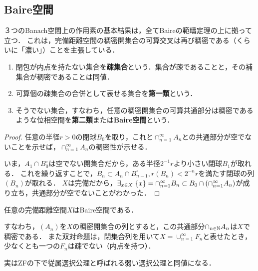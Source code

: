 \documentclass[uplatex,dvipdfmx]{jsreport}
\begin{document}
\subsection{Baire空間}

\begin{tcolorbox}[colframe=ForestGreen, colback=ForestGreen!10!white,breakable,colbacktitle=ForestGreen!40!white,coltitle=black,fonttitle=\bfseries\sffamily,
    title=]
        ３つのBanach空間上の作用素の基本結果は，全てBaireの範疇定理の上に拠って立つ．
        これは，完備距離空間の稠密開集合の可算交叉は再び稠密である（くらいに「濃い」）ことを主張している．
\end{tcolorbox}

\begin{definition}\mbox{}
    \begin{enumerate}
        \item 閉包が内点を持たない集合を\textbf{疎集合}という．集合が疎であることと，その補集合が稠密であることは同値．
        \item 可算個の疎集合の合併として表せる集合を\textbf{第一類}という．
        \item そうでない集合，すなわち，任意の稠密開集合の可算共通部分は稠密であるような位相空間を\textbf{第二類}または\textbf{Baire空間}という．
    \end{enumerate}
\end{definition}
\begin{proof}
    任意の半径$r>0$の閉球$B_0$を取り，これと$\cap_{n=1}^\infty A_n$との共通部分が空でないことを示せば，$\cap_{n=1}^\infty A_n$の稠密性が示せる．

    いま，$A_1\cap B_0^\circ$は空でない開集合だから，ある半径$2^{-1}r$より小さい閉球$B_1$が取れる．
    これを繰り返すことで，$B_n\subset A_n\cap B^\circ_{n-1},r(B_n)<2^{-n}r$を満たす閉球の列$(B_n)$が取れる．
    $X$は完備だから，$\exists_{x\in X}\;\{x\}=\cap_{n=1}^\infty B_n\subset B_0\cap\left(\cap_{n=1}^\infty A_n\right)$が成り立ち，共通部分が空でないことがわかった．
\end{proof}

\begin{proposition}
    任意の完備距離空間$X$はBaire空間である．
    
    すなわち，$(A_n)$を$X$の稠密開集合の列とすると，この共通部分$\cap_{n\in\mathbb{N}}A_n$は$X$で稠密である．
    また双対命題は，閉集合列を用いて$X=\cup_{n=1}^\infty F_n$と表せたとき，少なくとも一つの$F_n$は疎でない（内点を持つ）．
\end{proposition}
\begin{remark}
    実はZFの下で従属選択公理と呼ばれる弱い選択公理と同値になる．
\end{remark}
\end{document}
